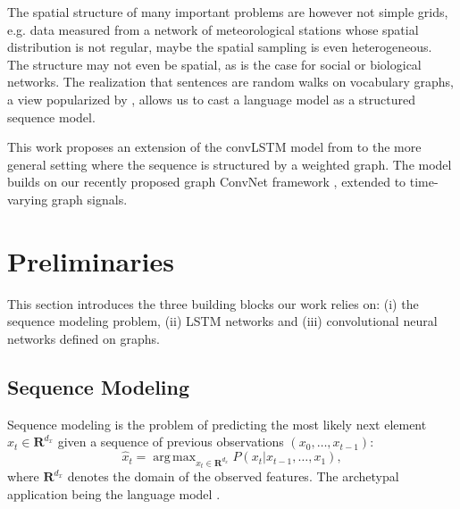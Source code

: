 \documentclass{article} %
\DeclareMathOperator*{\argmax}{arg\,max}
\begin{document}

The spatial structure of many important problems are however not simple grids,
e.g. data measured from a network of meteorological stations whose spatial
distribution is not regular, maybe the spatial sampling is even heterogeneous.
The structure may not even be spatial, as is the case for social or biological
networks. The realization that sentences are random walks on vocabulary graphs,
a view popularized by \cite{word2vec}, allows us to cast a language model as a
structured sequence model.

This work proposes an extension of the convLSTM model from \cite{convlstm} to
the more general setting where the sequence is structured by a weighted graph.
The model builds on our recently proposed graph ConvNet framework
\citep{gcnn}, extended to time-varying graph signals.


\section{Preliminaries}

This section introduces the three building blocks our work relies on: (i) the
sequence modeling problem, (ii) LSTM networks and (iii) convolutional neural
networks defined on graphs.

\subsection{Sequence Modeling}

Sequence modeling is the problem of predicting the most likely next element
$\hat{x}_t \in \mathbf{R}^{d_x}$ given a sequence of previous observations
$(x_0, \ldots, x_{t-1})$:
\begin{equation} \label{eqn:seq}
	\hat{x}_t = \argmax_{x_t \in \mathbf{R}^{d_x}} P(x_t | x_{t-1}, \ldots, x_1),
\end{equation}
where $\mathbf{R}^{d_x}$ denotes the domain of the observed features. The
archetypal application being the language model \citep{seq_graves}.
\end{document}
